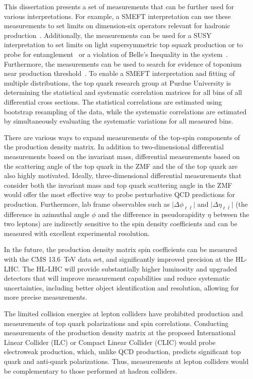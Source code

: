 \begin{refsection}
This dissertation presents a set of measurements that can be further used for various interpretations. 
For example, a SMEFT interpretation can use these measurements to set limits on dimension-six operators relevant for hadronic \ttbar production~\cite{Sirunyan:2681777}. 
Additionally, the measurements can be used for a SUSY interpretation to set limits on light supersymmetric top squark production or to probe for entanglement~\cite{Afik_2021} or a violation of Belle's Inequality in the \ttbar system~\cite{Aguilar_Saavedra_2022}. 
Furthermore, the measurements can be used to search for evidence of toponium near \ttbar production threshold~\cite{PhysRevD.104.034023}. 
To enable a SMEFT interpretation and fitting of multiple distributions, the top quark research group at Purdue University is determining the statistical and systematic correlation matrices for all bins of all differential cross sections. 
The statistical correlations are estimated using bootstrap resampling of the data, while the systematic correlations are estimated by simultaneously evaluating the systematic variations for all measured bins.

There are various ways to expand measurements of the top-spin components of the \ttbar production density matrix. 
In addition to two-dimensional differential measurements based on the \ttbar invariant mass, differential measurements based on the scattering angle of the top quark in the \ttbar ZMF and the \pT of the top quark are also highly motivated. 
Ideally, three-dimensional differential measurements that consider both the \ttbar invariant mass and top quark scattering angle in the \ttbar ZMF would offer the most effective way to probe perturbative QCD predictions for \ttbar production.
Furthermore, lab frame observables such as $\vert \Delta\phi_{\ell\bar{\ell}} \vert$ and $\vert \Delta\eta_{\ell\bar{\ell}} \vert$ (the difference in azimuthal angle $\phi$ and the difference in pseudorapidity $\eta$ between the two leptons) are indirectly sensitive to the spin density coefficients and can be measured with excellent experimental resolution.

In the future, the \ttbar production density matrix spin coefficients can be measured with the CMS \SI{13.6}{\TeV} data set, and significantly improved precision at the HL-LHC.
The HL-LHC will provide substantially higher luminosity and upgraded detectors that will improve measurement capabilities and reduce systematic uncertainties, including better object identification and resolution, allowing for more precise measurements.

The limited collision energies at lepton colliders have prohibited \ttbar production and measurements of top quark polarizations and \ttbar spin correlations. 
Conducting measurements of the \ttbar production density matrix at the proposed International Linear Collider (ILC) or Compact Linear Collider (CLIC) would probe electroweak \ttbar production, which, unlike QCD production, predicts significant top quark and anti-quark polarizations. 
Thus, measurements at lepton colliders would be complementary to those performed at hadron colliders.

\clearpage
\printbibliography[heading=subbibliography,resetnumbers=true]
\end{refsection}